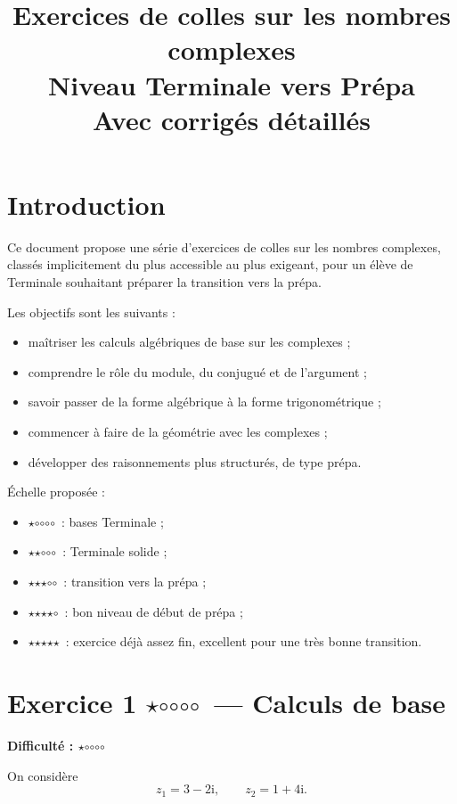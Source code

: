 \documentclass[11pt,a4paper]{article}
\title{\Huge Exercices de colles sur les nombres complexes\\[0.5em]
\Large Niveau Terminale vers Prépa\\[0.3em]
\large Avec corrigés détaillés}
\author{}
\date{}
\newcommand{\ii}{\mathrm{i}}
\newcommand{\fullstar}{\(\star\)}
\newcommand{\emptystar}{\(\circ\)}
\newcommand{\oneStar}{\fullstar\emptystar\emptystar\emptystar\emptystar}
\newcommand{\twoStars}{\fullstar\fullstar\emptystar\emptystar\emptystar}
\newcommand{\threeStars}{\fullstar\fullstar\fullstar\emptystar\emptystar}
\newcommand{\fourStars}{\fullstar\fullstar\fullstar\fullstar\emptystar}
\newcommand{\fiveStars}{\fullstar\fullstar\fullstar\fullstar\fullstar}
\newcommand{\difficulty}[1]{\textbf{Difficulté : #1}}
\begin{document}
\maketitle

\tableofcontents
\newpage

\section*{Introduction}
Ce document propose une série d'exercices de colles sur les nombres complexes, classés implicitement du plus accessible au plus exigeant, pour un élève de Terminale souhaitant préparer la transition vers la prépa.

Les objectifs sont les suivants :
\begin{itemize}[label=--]
    \item maîtriser les calculs algébriques de base sur les complexes ;
    \item comprendre le rôle du module, du conjugué et de l'argument ;
    \item savoir passer de la forme algébrique à la forme trigonométrique ;
    \item commencer à faire de la géométrie avec les complexes ;
    \item développer des raisonnements plus structurés, de type prépa.
\end{itemize}

\medskip

Échelle proposée :
\begin{itemize}[label=--]
    \item \oneStar\ : bases Terminale ;
    \item \twoStars\ : Terminale solide ;
    \item \threeStars\ : transition vers la prépa ;
    \item \fourStars\ : bon niveau de début de prépa ;
    \item \fiveStars\ : exercice déjà assez fin, excellent pour une très bonne transition.
\end{itemize}

\newpage

\section{Exercice 1 \oneStar\ --- Calculs de base}
\difficulty{\oneStar}

On considère
\[
z_1=3-2\ii, \qquad z_2=1+4\ii.
\]
\end{document}
